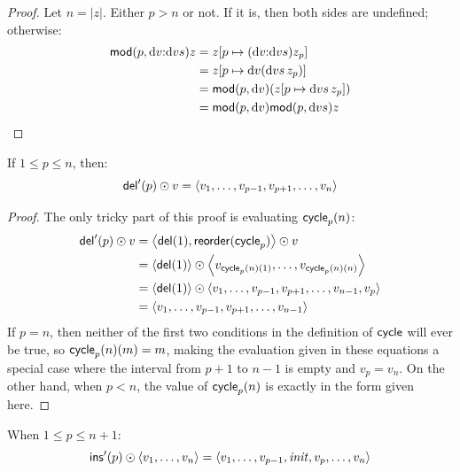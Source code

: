 \begin{proof}
    Let $n=|z|$.  Either $p>n$ or not. If it is, then both sides are
    undefined; otherwise:
    \begin{align*}
        \mathsf{mod}(p,\textrm{d} v\mathord{:}\textrm{d} v s)z
            &= z[p \mapsto (\textrm{d} v\mathord{:}\textrm{d} v s)z_p] \\
            &= z[p \mapsto \textrm{d} v(\textrm{d} v s\,z_p)] \\
            &= \mathsf{mod}(p,\textrm{d} v)(z[p \mapsto \textrm{d} v s\,z_p]) \\
            &= \mathsf{mod}(p,\textrm{d} v)\mathsf{mod}(p,\textrm{d} v s)z
    \end{align*}
\end{proof}

\begin{lemma}
\label{lemma:high-level-delete}
If $1 \le p \le n$, then:
\[\mathsf{del}'(p) \odot v = \left< v_1 ,\ldots, v_{p-1} , v_{p+1} ,\ldots, v_n \right>\]
\end{lemma}

\begin{proof}
The only tricky part of this proof is evaluating $\mathsf{cycle}_p(n)$:
\begin{align*}
    \mathsf{del}'(p) \odot v
        &= \left<\mathsf{del}(1),\mathsf{reorder}(\mathsf{cycle}_p)\right> \odot v \\
        &= \left<\mathsf{del}(1)\right> \odot \left< v_{\mathsf{cycle}_p(n)(1)} ,\ldots, v_{\mathsf{cycle}_p(n)(n)} \right> \\
        &= \left<\mathsf{del}(1)\right> \odot \left< v_1 ,\ldots, v_{p-1} , v_{p+1} ,\ldots, v_{n-1} , v_p \right> \\
        &= \left< v_1 ,\ldots, v_{p-1} , v_{p+1} ,\ldots, v_{n-1} \right>
\end{align*}
If $p=n$, then neither of the first two conditions in the definition of
$\mathsf{cycle}$ will ever be true, so $\mathsf{cycle}_p(n)(m)=m$, making the
evaluation given in these equations a special case where the interval from
$p+1$ to $n-1$ is empty and $v_p=v_n$. On the other hand, when $p<n$, the
value of $\mathsf{cycle}_p(n)$ is exactly in the form given here.
\end{proof}

\begin{lemma}
\label{lemma:high-level-insert}
When $1 \le p \le n+1$:
\[\mathsf{ins}'(p) \odot \left< v_1 ,\ldots, v_n \right> =
    \left< v_1 ,\ldots, v_{p-1} , \mathit{init} , v_p ,\ldots, v_n \right>\]
\end{lemma}

